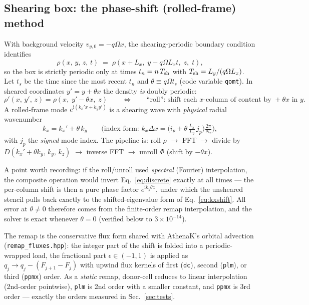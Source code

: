 \documentclass[11pt]{article}
\newcommand{\code}[1]{\texttt{#1}}
\begin{document}
\subsection{Shearing box: the phase-shift (rolled-frame) method}
\label{sec:shear}
With background velocity $v_{y,0}=-q\Omega x$, the shearing-periodic boundary
condition identifies
\begin{equation}
  \rho(x,\,y,\,z,\,t) \;=\; \rho(x+L_x,\; y - q\Omega L_x t,\; z,\; t),
\end{equation}
so the box is strictly periodic only at times $t_n=n\,T_{\rm sh}$ with
$T_{\rm sh}=L_y/(q\Omega L_x)$. Let $t_s$ be the time since the most recent $t_n$
and $\theta \equiv q\Omega t_s$ (code variable \code{qomt}). In sheared coordinates
$y' = y + \theta x$ the density \emph{is} doubly periodic:
\begin{equation}
  \rho'(x,\,y',\,z) = \rho(x,\; y'-\theta x,\; z)
  \qquad\Longleftrightarrow\qquad
  \text{``roll'': shift each $x$-column of content by } +\theta x \text{ in } y .
  \label{eq:roll}
\end{equation}
A rolled-frame mode $e^{\mathrm{i}(k_x'x + k_y y')}$ is a shearing wave with
\emph{physical} radial wavenumber
\begin{equation}
  k_x = k_x' + \theta\,k_y
  \qquad\text{(index form: } k_x\Delta x = \bigl(i_p + \theta\,\tfrac{L_x}{L_y}\,j_p\bigr)\tfrac{2\pi}{N_x}\text{)},
  \label{eq:kxshift}
\end{equation}
with $j_p$ the \emph{signed} mode index. The pipeline is: roll $\rho$
$\to$ FFT $\to$ divide by $D(k_x'{+}\theta k_y,\,k_y,\,k_z)$ $\to$ inverse FFT
$\to$ unroll $\Phi$ (shift by $-\theta x$).

A point worth recording: if the roll/unroll used \emph{spectral} (Fourier)
interpolation, the composite operation would invert Eq.~\eqref{eq:discrete}
exactly at all times --- the per-column shift is then a pure phase factor
$e^{\mathrm{i}k_y\theta x}$, under which the unsheared stencil pulls back exactly
to the shifted-eigenvalue form of Eq.~\eqref{eq:kxshift}. All error at
$\theta\neq0$ therefore comes from the finite-order remap interpolation, and the
solver is exact whenever $\theta=0$ (verified below to $3\times10^{-14}$).

The remap is the conservative flux form shared with AthenaK's orbital
advection (\code{remap\_fluxes.hpp}): the integer part of the shift is folded
into a periodic-wrapped load, the fractional part $\epsilon\in(-1,1)$ is applied as
$q_j \to q_j - (F_{j+1}-F_j)$ with upwind flux kernels of first
(\code{dc}), second (\code{plm}), or third (\code{ppmx}) order. As a
\emph{static} remap, donor-cell reduces to linear interpolation (2nd-order
pointwise), \code{plm} is 2nd order with a smaller constant, and \code{ppmx} is 3rd
order --- exactly the orders measured in Sec.~\ref{sec:tests}.
\end{document}

